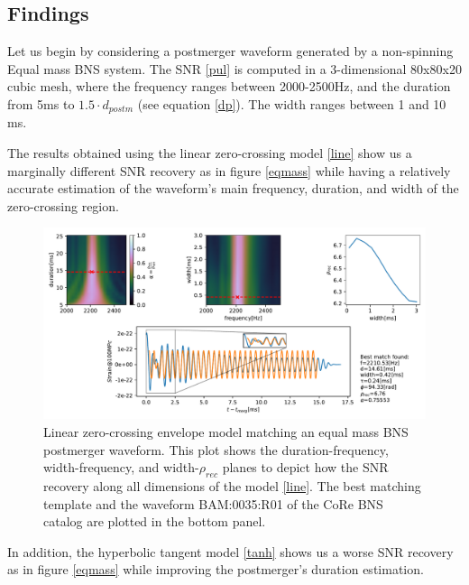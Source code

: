 \subsection*{Findings}

Let us begin by considering a postmerger waveform generated by a non-spinning Equal mass BNS system. The SNR \ref{pul} is computed in a 3-dimensional 80x80x20 cubic mesh, where the frequency ranges between 2000-2500Hz, and the duration from 5ms to $1.5\cdot d_{postm}$ (see equation \ref{dp}). The width ranges between 1 and 10 ms.

The results obtained using the linear zero-crossing model \ref{line} show us a marginally different SNR recovery as in figure \ref{eqmass} while having a relatively accurate estimation of the waveform's main frequency, duration, and width of the zero-crossing region.

\begin{figure}[hbt!]
\begin{center}
\includegraphics[width=\textwidth, angle=0]{images/Data_analysis/results/envel_35_lin.pdf}
\captionsetup{width=0.8\textwidth}
\caption[Linear zero-crossing envelope model matching an equal mass BNS postmerger waveform]{Linear zero-crossing envelope model matching an equal mass BNS postmerger waveform. This plot shows the duration-frequency, width-frequency, and width-$\rho_{rec}$ planes to depict how the SNR recovery along all dimensions of the model \ref{line}. The best matching template and the waveform BAM:0035:R01 of the CoRe BNS catalog \cite{Dietrich:2018phi} are plotted in the bottom panel.}
\end{center} 
\end{figure}

\FloatBarrier

In addition, the hyperbolic tangent model \ref{tanh} shows us a worse SNR recovery as in figure \ref{eqmass} while improving the postmerger's duration estimation.


